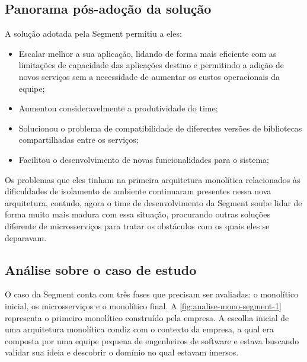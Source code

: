\subsection{Panorama pós-adoção da solução}

A solução adotada pela Segment permitiu a eles:

\begin{itemize}
    \item Escalar melhor a sua aplicação, lidando de forma mais eficiente com as limitações de
        capacidade das aplicações destino e permitindo a adição de novos serviços sem a necessidade
        de aumentar os custos operacionais da equipe;
    \item Aumentou consideravelmente a produtividade do time;
    \item Solucionou o problema de compatibilidade de diferentes versões de bibliotecas
        compartilhadas entre os serviços;
    \item Facilitou o desenvolvimento de novas funcionalidades para o sistema;
\end{itemize}

Os problemas que eles tinham na primeira arquitetura monolítica relacionados às dificuldades de
isolamento de ambiente continuaram presentes nessa nova arquitetura, contudo, agora o time de
desenvolvimento da Segment soube lidar de forma muito mais madura com essa situação, procurando
outras soluções diferente de microsserviços para tratar os obstáculos com os quais eles se
deparavam.

\subsection{Análise sobre o caso de estudo}

O caso da Segment conta com três fases que precisam ser avaliadas: o monolítico inicial, os
microsserviços e o monolítico final. A \autoref{fig:analise-mono-segment-1} representa o
primeiro monolítico construído pela empresa. A escolha inicial de uma arquitetura monolítica condiz
com o contexto da empresa, a qual era composta por uma equipe pequena de engenheiros de software e
estava buscando validar sua ideia e descobrir o domínio no qual estavam imersos. 

